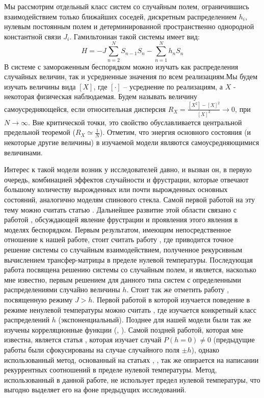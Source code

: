 	Мы рассмотрим отдельный класс систем со случайным полем, ограничившись взаимодействием только ближайших соседей, дискретным распределением $h_i$, нулевым постоянным полем и детерминированной пространственно однородной константной связи $J_i$. Гамильтониан такой системы имеет вид:
	\begin{equation}
		H = - J \sum_{n=2}^{N} S_{n-1} S_n - \sum_{n=1}^N h_n S_n
	\end{equation}
    В системе с замороженным беспорядком можно изучать как распределения случайных величин, так и усредненные значения по всем реализациям.Мы будем изучать величины вида $[X]$, где $[\cdot]$ -- усреднение по реализациям, а $X$ - некоторая физическая наблюдаемая. Будем называть величину самоусредняющейся, если относительная дисперсия $R_X = \frac{ [X^2]-[X]^2}{[X]^2} \to 0$, при  $ N\to \infty$. Вне критической точки, это свойство обуславливается центральной предельной теоремой ($R_X \simeq \frac{1}{N}$).
	Отметим, что энергия основного состояния (и некоторые другие величины) в изучаемой модели являются самоусредняющимися величинами.
	
	Интерес к такой модели возник у исследователей давно, и вызван он, в первую очередь, комбинацией эффектов случайности и фрустрации, которые отвечают большому количеству вырожденных или почти вырожденных основных состояний, аналогично моделям спинового стекла. Самой первой работой на эту тему можно считать статью \cite{fan1969one}. Дальнейшее развитие этой области связано с работой \cite{vannimenus1977theory}, обсуждающей явление фрустрации и проявления этого явления в моделях беспорядком. Первым результатом, имеющим непосредственное отношение к нашей работе, стоит считать работу
	\cite{derrida1978simple}, где приводится точное решение системы со случайным взаимодействием, полученное рекурсивным вычислением трансфер-матрицы в пределе нулевой температуры. Последующая работа \cite{PhysRevB.27.4503} посвящена решению системы со случайным полем, и является, насколько мне известно, первым решением для данного типа систем с определенными распределениями случайно величины $h$. Стоит так же отметить работу \cite{derrida1983singular}, посвященную режиму $J>h$. Первой работой в которой изучается поведение в режиме ненулевой температуры можно считать \cite{nieuwenhuizen1986exactly}, где изучается конкретный класс распределений $h$ (экспоненциальный). Позднее для нашей модели были так же изучены корреляционные функции (\cite{farhi1993correlation}, \cite{igloi1994correlations}). Самой поздней работой, которая мне известна, является статья \cite{hamasaki2004exact}, которая изучает случай $P(h=0) \neq 0$ (предыдущие работы были сфокусированы на случае случайного поля $\pm h$), однако использованный метод, основанный на статьях \cite{dress1995zero}, \cite{kadowaki1996exact}, так же опирается на написании рекуррентных соотношений в пределе нулевой температуры. Метод, использованный в данной работе, не использует предел нулевой температуры, что выгодно выделяет его на фоне предыдущих исследований.
	
